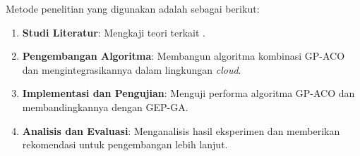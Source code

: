 Metode penelitian yang digunakan adalah sebagai berikut:

\begin{enumerate}
  \item \textbf{Studi Literatur}: Mengkaji teori terkait . 
  \item \textbf{Pengembangan Algoritma}: Membangun algoritma kombinasi GP-ACO dan mengintegrasikannya dalam lingkungan \textit{cloud}. 
  \item \textbf{Implementasi dan Pengujian}: Menguji performa algoritma GP-ACO dan membandingkannya dengan GEP-GA. 
  \item \textbf{Analisis dan Evaluasi}: Menganalisis hasil eksperimen dan memberikan rekomendasi untuk pengembangan lebih lanjut.
\end{enumerate}
